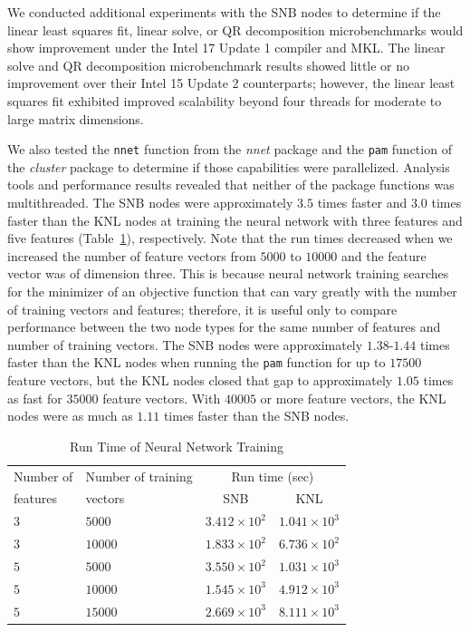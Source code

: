 We conducted additional experiments with the SNB nodes to determine if the linear least
squares fit, linear solve, or QR decomposition microbenchmarks would show improvement
under the Intel 17 Update 1 compiler and MKL. The linear solve and QR decomposition
microbenchmark results showed little or no improvement over their Intel 15 Update 2
counterparts; however, the linear least squares fit exhibited improved scalability beyond
four threads for moderate to large matrix dimensions.

We also tested the \texttt{nnet} function from the \textit{nnet} package and the
\texttt{pam} function of the \textit{cluster} package to determine if those capabilities
were parallelized.  Analysis tools and performance results revealed that neither of the
package functions was multithreaded.  The SNB nodes were approximately $3.5$
times faster and $3.0$ times faster than the KNL nodes at training the neural network with
three features and five features (Table~\ref{tab:nnetResults}), respectively. Note that
the run times decreased when we increased the number of feature vectors from $5000$ to
$10000$ and the feature vector was of dimension three. This is because neural network
training searches for the minimizer of an objective function that can vary
greatly with the number of training vectors and features; therefore, it is useful only to
compare performance between the two node types for the same number of features and number
of training vectors.  The SNB nodes were approximately $1.38$-$1.44$ times faster than the
KNL nodes when running the \texttt{pam} function for up to $17500$ feature vectors, but
the KNL nodes closed that gap to approximately $1.05$ times as fast for $35000$ feature
vectors. With $40005$ or more feature vectors, the KNL nodes were as much as $1.11$ times
faster than the SNB nodes.

\begin{table}
  \caption{Run Time of Neural Network Training}
  \label{tab:nnetResults}
  \begin{tabular}{llcc}
    \toprule
      Number of & Number of training & \multicolumn{2}{c}{Run time (sec)}\\
      features  & vectors            & SNB & KNL\\
    \midrule
    $3$ & $5000$  & $3.412\times 10^{2}$ & $1.041\times 10^{3}$ \\
    $3$ & $10000$ & $1.833\times 10^{2}$ & $6.736\times 10^{2}$ \\
    $5$ & $5000$  & $3.550\times 10^{2}$ & $1.031\times 10^{3}$ \\
    $5$ & $10000$ & $1.545\times 10^{3}$ & $4.912\times 10^{3}$ \\
    $5$ & $15000$ & $2.669\times 10^{3}$ & $8.111\times 10^{3}$ \\
    \bottomrule
  \end{tabular}
\end{table}

